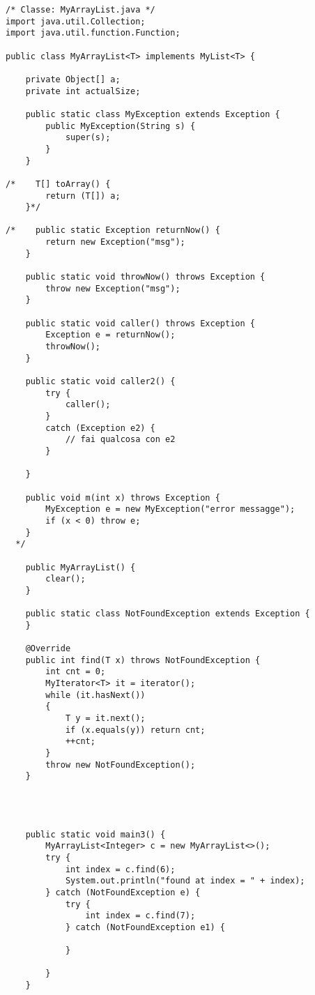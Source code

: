 \begin{lstlisting}[basicstyle=\small,]
/* Classe: MyArrayList.java */
import java.util.Collection;
import java.util.function.Function;

public class MyArrayList<T> implements MyList<T> {

    private Object[] a;
    private int actualSize;

    public static class MyException extends Exception {
        public MyException(String s) {
            super(s);
        }
    }

/*    T[] toArray() {
        return (T[]) a;
    }*/

/*    public static Exception returnNow() {
        return new Exception("msg");
    }

    public static void throwNow() throws Exception {
        throw new Exception("msg");
    }

    public static void caller() throws Exception {
        Exception e = returnNow();
        throwNow();
    }

    public static void caller2() {
        try {
            caller();
        }
        catch (Exception e2) {
            // fai qualcosa con e2
        }

    }

    public void m(int x) throws Exception {
        MyException e = new MyException("error messagge");
        if (x < 0) throw e;
    }
  */

    public MyArrayList() {
        clear();
    }

    public static class NotFoundException extends Exception {
    }

    @Override
    public int find(T x) throws NotFoundException {
        int cnt = 0;
        MyIterator<T> it = iterator();
        while (it.hasNext())
        {
            T y = it.next();
            if (x.equals(y)) return cnt;
            ++cnt;
        }
        throw new NotFoundException();
    }




    public static void main3() {
        MyArrayList<Integer> c = new MyArrayList<>();
        try {
            int index = c.find(6);
            System.out.println("found at index = " + index);
        } catch (NotFoundException e) {
            try {
                int index = c.find(7);
            } catch (NotFoundException e1) {

            }

        }
    }


\end{lstlisting}
